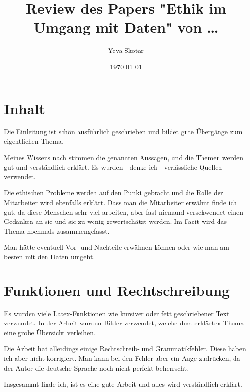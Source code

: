 \documentclass{article}
\title{Review des Papers "Ethik im Umgang mit Daten" von \dots}
\author{Yeva Skotar}
\date{\today}
\begin{document}
\maketitle


\section{Inhalt}
Die Einleitung ist schön ausführlich geschrieben und bildet gute Übergänge zum eigentlichen Thema.

Meines Wissens nach stimmen die genannten Aussagen, und  die Themen werden gut und verständlich erklärt. Es wurden - denke ich - verlässliche Quellen verwendet.

Die ethischen Probleme werden auf den Punkt gebracht und die Rolle der Mitarbeiter wird ebenfalls erklärt. Dass man die Mitarbeiter erwähnt finde ich gut, da diese Menschen sehr viel arbeiten, aber fast niemand verschwendet einen Gedanken an sie und sie zu wenig gewertschätzt werden.
Im Fazit wird das Thema nochmals zusammengefasst.

Man hätte eventuell Vor- und Nachteile erwähnen können oder wie man am besten mit den Daten umgeht.

\section{Funktionen und Rechtschreibung}
Es wurden viele Latex-Funktionen wie kursiver oder fett geschriebener Text verwendet. In der Arbeit wurden Bilder 
verwendet, welche dem erklärten Thema eine grobe Übersicht verleihen.

Die Arbeit hat allerdings einige Rechtschreib- und Grammatikfehler. Diese haben ich aber nicht korrigiert.
Man kann bei den Fehler aber ein Auge zudrücken, da der Autor die deutsche Sprache noch nicht perfekt beherrscht.
\bigskip

Insgesammt finde ich, ist es eine gute Arbeit und alles wird verständlich erklärt.
\end{document}
